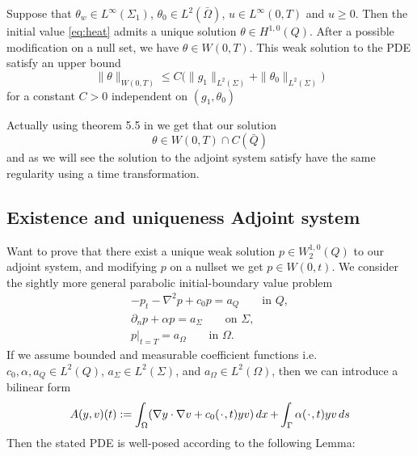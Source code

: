 \begin{corollary}[Existence]
Suppose that $\theta_w \in L^{\infty}(\Sigma_1)$, $\theta_0 \in L^2(\bar{\Omega})$, $u \in L^{\infty}(0,T)$ and $u\geq 0$. Then the initial value \eqref{eq:heat} admits a unique solution $\theta \in H^{1,0}(Q)$. After a possible modification on a null set, we have $\theta \in W(0,T)$. This weak solution to the PDE satisfy an upper bound 
\begin{equation*}
    \|\theta \|_{W(0,T)} \leq C\bigg ( \|g_1\|_{L^2(\Sigma)} + \|\theta_0\|_{L^2(\Sigma)} \bigg )
\end{equation*}
for a constant $C>0$ independent on $(g_1, \theta_0)$
\end{corollary}

Actually using theorem 5.5 in \cite{optimalControl} we get that our solution 
\begin{equation*}
    \theta \in W(0,T) \cap C (\bar{Q})
\end{equation*}
and as we will see the solution to the adjoint system satisfy have the same regularity using a time transformation. 


\subsection{Existence and uniqueness Adjoint system}
Want to prove that there exist a unique weak solution $p \in W_2^{1,0}(Q)$ to our adjoint system, and modifying $p$ on a nullset we get $p\in W(0,t)$. We consider the sightly more general parabolic initial-boundary value problem 
\begin{align*}
    -p_t -\nabla^2p +c_0p = a_Q \qquad \text{in } Q, \\
    \partial_np + \alpha p = a_{\Sigma} \qquad \text{on } \Sigma, \\
    p|_{t=T} = a_{\Omega} \qquad \text{in } \Omega.
\end{align*}
If we assume bounded and measurable coefficient functions i.e. $c_0, \alpha, a_Q \in L^2(Q)$, $a_{\Sigma} \in L^2(\Sigma)$, and $a_{\Omega} \in L^2(\Omega)$, then we can introduce a bilinear form
\begin{equation}
    \label{eq:parabolic_adj}
    A(y,v)(t) := \int_{\Omega}(\nabla y \cdot \nabla v + c_0(\placeholder,t) y v) \dx + \int_{\Gamma}\alpha(\placeholder,t) y v \ds
\end{equation}
Then the stated PDE is well-posed according to the following Lemma:


